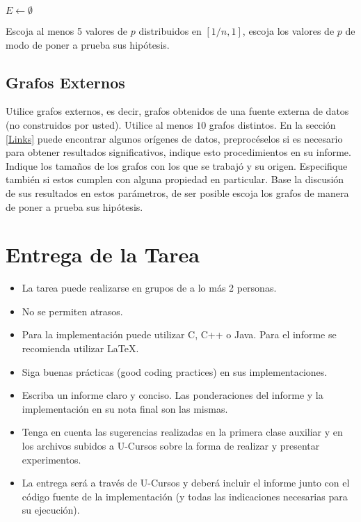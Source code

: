 \documentclass[dcc,uchile]{fcfmcourse}
\begin{document}
\begin{algorithm}[H]

\SetAlgoLined
{}
 $E\gets \emptyset$\;

 
\end{algorithm}
Escoja al menos 5 valores de $p$ distribuidos en $[1/n,  1]$, escoja los valores de $p$ de modo de poner a prueba sus hipótesis.
\subsection*{Grafos Externos}
Utilice grafos externos, es decir, grafos obtenidos de una fuente externa de datos (no construidos por usted). Utilice al menos $10$ grafos distintos. En la sección  \ref{Links} puede encontrar algunos orígenes de datos, preprocéselos si es necesario para obtener resultados significativos, indique esto procedimientos en su informe. Indique los tamaños de los grafos con los que se trabajó y su origen. Especifique también si estos cumplen con alguna propiedad en particular. Base la discusión de sus resultados en estos parámetros, de ser posible escoja los grafos de manera de poner a prueba sus hipótesis.
\newpage
\section{Entrega de la Tarea}
\begin{itemize}
    \item La tarea puede realizarse en grupos de a lo más 2 personas.
    \item No se permiten atrasos.
    \item Para la implementación puede utilizar C, C++ o Java. Para el informe se recomienda utilizar \LaTeX .
    \item Siga buenas prácticas (good coding practices) en sus implementaciones.
    \item Escriba un informe claro y conciso. Las ponderaciones del informe y la implementación en su nota final son las mismas.
    \item Tenga en cuenta las sugerencias realizadas en la primera clase auxiliar y en los archivos subidos a U-Cursos sobre la forma de realizar y presentar experimentos.
    \item La entrega será a través de U-Cursos y deberá incluir el informe junto con el código fuente de la implementación (y todas las indicaciones necesarias para su ejecución).
\end{itemize}
\end{document}
